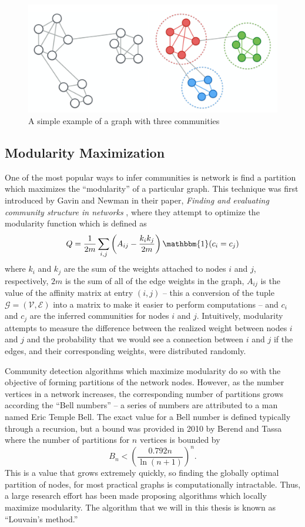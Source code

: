 \documentclass[../thesis.tex]{subfiles}
\begin{document}
\begin{figure}
    \centering
    \includegraphics[width=.7\linewidth]{images/comm_detection.pdf}
    \caption[Simple Community Detection Example]{A simple example of a graph with three communities}
    \label{fig:simple_cd}
\end{figure}

\subsection{Modularity Maximization}
One of the most popular ways to infer communities is network is find a partition which maximizes the ``modularity'' of a particular graph. This technique was first introduced by Gavin and Newman in their paper, \textit{Finding and evaluating community structure in networks} \cite{newman2004finding}, where they attempt to optimize the modularity function which is defined as
\begin{equation}
    Q = \frac{1}{2m} \sum_{i,j} \left(A_{ij} - \frac{k_i k_j}{2m} \right)\mathbbm{1}(c_i = c_j)
\end{equation}
where $k_i$ and $k_j$ are the sum of the weights attached to nodes $i$ and $j$, respectively, $2m$ is the sum of all of the edge weights in the graph, $A_{ij}$ is the value of the affinity matrix at entry $(i, j)$ -- this a conversion of the tuple $\mathcal{G} = (\mathcal{V}, \mathcal{E})$ into a matrix to make it easier to perform computations -- and $c_i$ and $c_j$ are the inferred communities for nodes $i$ and $j$. Intuitively, modularity attempts to measure the difference between the realized weight between nodes $i$ and $j$ and the probability that we would see a connection between $i$ and $j$ if the edges, and their corresponding weights, were distributed randomly.

Community detection algorithms which maximize modularity do so with the objective of forming partitions of the network nodes. However, as the number vertices in a network increases, the corresponding number of partitions grows according the ``Bell numbers'' -- a series of numbers are attributed to a man named Eric Temple Bell. The exact value for a Bell number is defined typically through a recursion, but a bound was provided in 2010 by Berend and Tassa \cite{berend2010improved} where the number of partitions for $n$ vertices is bounded by
\begin{equation}
    B_n < \left(\frac{0.792n}{\ln(n + 1)} \right)^n.
\end{equation}
This is a value that grows extremely quickly, so finding the globally optimal partition of nodes, for most practical graphs is computationally intractable. Thus, a large research effort has been made proposing algorithms which locally maximize modularity. The algorithm that we will in this thesis is known as ``Louvain's method.''
\end{document}
